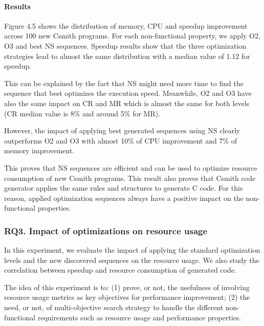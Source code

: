 \paragraph{Results}
Figure 4.5 shows the distribution of memory, CPU and speedup improvement across 100 new Csmith programs. For each non-functional property, we apply O2, O3 and best NS sequences. Speedup results show that the three optimization strategies lead to almost the same distribution with a median value of 1.12 for speedup. 

This can be explained by the fact that NS might need more time to find the sequence that best optimizes the execution speed. Meanwhile, O2 and O3 have also the same impact on CR and MR which is almost the same for both levels (CR median value is 8\% and around 5\% for MR).

However, the impact of applying best generated sequences using NS clearly outperforms O2 and O3 with almost 10\% of CPU improvement and 7\% of memory improvement. 

This proves that NS sequences are efficient and can be used to optimize resource consumption of new Csmith programs. This result also proves that Csmith code generator applies the same rules and structures to generate C code. For this reason, applied optimization sequences always have a positive impact on the non-functional properties.

\noindent{}


\subsubsection{RQ3. Impact of optimizations on resource usage}
In this experiment, we evaluate the impact of applying the standard optimization levels and the new discovered sequences on the resource usage. We also study the correlation between speedup and resource consumption of generated code. 

The idea of this experiment is to: (1) prove, or not, the usefulness of involving resource usage metrics as key objectives for performance improvement; (2) the need, or not, of multi-objective search strategy to handle the different non-functional requirements such as resource usage and performance properties.

